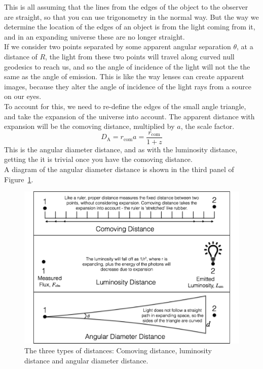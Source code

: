 \documentclass[]{article}
\begin{document}
\noindent This is all assuming that the lines from the edges of the object to the observer are straight, so that you can use trigonometry in the normal way. But the way we determine the location of the edges of an object is from the light coming from it, and in an expanding universe these are no longer straight. \\

\noindent If we consider two points separated by some apparent angular separation $\theta$, at a distance of $R$, the light from these two points will travel along curved null geodesics to reach us, and so the angle of incidence of the light will not the the same as the angle of emission. This is like the way lenses can create apparent images, because they alter the angle of incidence of the light rays from a source on our eyes. \\

\noindent To account for this, we need to re-define the edges of the small angle triangle, and take the expansion of the universe into account. The apparent distance with expansion will be the comoving distance, multiplied by $a$, the scale factor. 
\begin{equation}
\boxed{D_\mathrm{A} = r_\mathrm{com} a = \frac{r_\mathrm{com}}{1+z}}
\end{equation}
This is the angular diameter distance, and as with the luminosity distance, getting the it is trivial once you have the comoving distance. \\

\noindent A diagram of the angular diameter distance is shown in the third panel of Figure~\ref{fig:distances}.

\begin{figure}
\hspace*{-2.7cm}
\includegraphics[width=18cm]{Typesofdistances.pdf}
\caption{The three types of distances: Comoving distance, luminosity distance and angular diameter distance.}
\label{fig:distances}
\end{figure}
\end{document}
